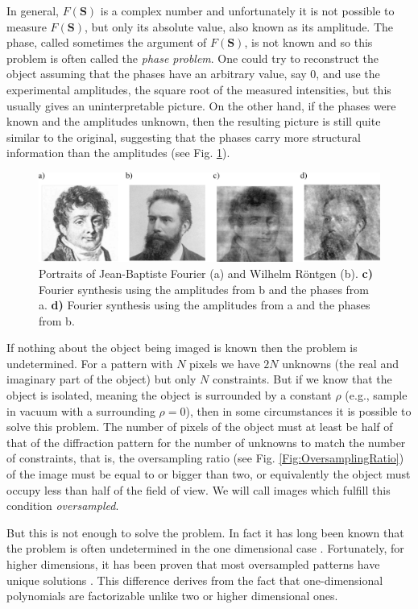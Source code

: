In general, $F(\mathbf S)$ is a complex number and unfortunately it is not
possible to measure $F(\mathbf S)$, but only its absolute value, also known as its
amplitude. The phase, called sometimes the argument of $F(\mathbf S)$, is not known and so
this problem is often called the {\em phase problem}. One could try to reconstruct the
object assuming that the phases have an arbitrary value, say 0, and use the
experimental amplitudes, the square root of the measured intensities, but this usually gives an uninterpretable picture. On
the other hand, if the phases were known and the amplitudes unknown, then the
resulting picture is still quite similar to the original, suggesting that the
phases carry more structural information than the amplitudes (see Fig. \ref{Fig:PhaseSwapping}).
\begin{figure}[h]
  \centering
  \includegraphics[width=1 \columnwidth]{Image_Reconstruction/PhaseSwapping2.png}
  \caption{Portraits of Jean-Baptiste Fourier (a) and Wilhelm R\"{o}ntgen (b).
    {\bf c)} Fourier synthesis using the amplitudes from b and the phases from
    a. {\bf d)}
    Fourier synthesis using the amplitudes from a and the phases from b.}
  \label{Fig:PhaseSwapping}
\end{figure}

If nothing about the object being imaged is known then the problem is
undetermined. For a pattern with $N$ pixels we have $2N$ unknowns (the real and
imaginary part of the object) but only $N$ constraints. But if we know that the object is isolated, meaning the
object is surrounded by a constant $\rho$ (e.g., sample in vacuum with a
surrounding $\rho = 0$), then in some circumstances it is possible to solve this
problem. The number of pixels of the object must at least be half of that of the
diffraction pattern for the number of unknowns to match the number of
constraints, that is, the oversampling ratio (see
Fig. \ref{Fig:OversamplingRatio}) of the image must be equal to or bigger than
two, or equivalently the object must occupy less than half of the field of
view. We will call images which fulfill this condition {\em oversampled}.

But this is not enough to solve the problem. In fact it
has long been known that the problem is often undetermined in the one dimensional case
\cite{Walther1963Question}. Fortunately, for higher dimensions, it has
been proven that most oversampled patterns have unique solutions
\cite{Bruck1979Ambiguity}. This difference derives from the fact that one-dimensional
polynomials are factorizable unlike two or higher dimensional ones.

